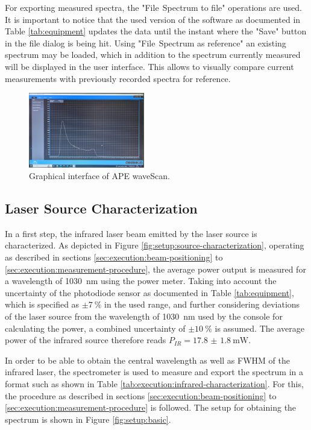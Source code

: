For exporting measured spectra, the "File$~$\textrightarrow$~$Spectrum to file" operations are used. It is important to notice that the used version of the software as documented in Table \ref{tab:equipment} updates the data until the instant where the "Save" button in the file dialog is being hit. Using "File$~$\textrightarrow$~$Spectrum as reference" an existing spectrum may be loaded, which in addition to the spectrum currently measured will be displayed in the user interface. This allows to visually compare current measurements with previously recorded spectra for reference.

\begin{figure}[H]
    \centering
    \includegraphics[width=0.45\textwidth]{graphics/wave-scan.jpg}
    \caption{Graphical interface of APE waveScan.}
    \label{fig:execution:wave-scan}
\end{figure}

\subsection{Laser Source Characterization}
\label{sec:execution:infrared-characterization}

In a first step, the infrared laser beam emitted by the laser source is characterized. As depicted in Figure \ref{fig:setup:source-characterization}, operating as described in sections \ref{sec:execution:beam-positioning} to \ref{sec:execution:measurement-procedure}, the average power output is measured for a wavelength of \SI{1030}{\nm} using the power meter. Taking into account the uncertainty of the photodiode sensor as documented in Table \ref{tab:equipment}, which is specified as $\pm \SI{7}{\percent}$ in the used range, and further considering deviations of the laser source from the wavelength of \SI{1030}{\nm} used by the console for calculating the power, a combined uncertainty of $\pm \SI{10}{\percent}$ is assumed. The average power of the infrared source therefore reads $P_{IR} = \SI{17.8(18)}{\mW}$.

In order to be able to obtain the central wavelength as well as FWHM of the infrared laser, the spectrometer is used to measure and export the spectrum in a format such as shown in Table \ref{tab:execution:infrared-characterization}. For this, the procedure as described in sections \ref{sec:execution:beam-positioning} to \ref{sec:execution:measurement-procedure} is followed. The setup for obtaining the spectrum is shown in Figure \ref{fig:setup:basic}.

